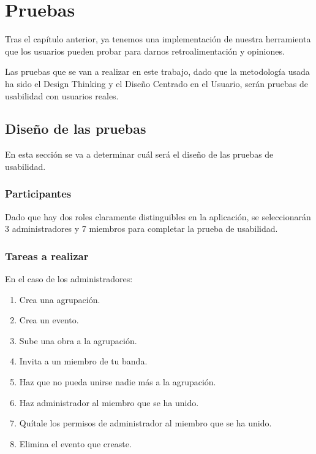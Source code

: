 \chapter{Pruebas}









Tras el capítulo anterior, ya tenemos una implementación de nuestra herramienta que los usuarios pueden probar para darnos retroalimentación y opiniones.

Las pruebas que se van a realizar en este trabajo, dado que la metodología usada ha sido el Design Thinking y el Diseño Centrado en el Usuario, serán pruebas de usabilidad con usuarios reales.

\section{Diseño de las pruebas}

En esta sección se va a determinar cuál será el diseño de las pruebas de usabilidad.

\subsection{Participantes}

Dado que hay dos roles claramente distinguibles en la aplicación, se seleccionarán 3 administradores y 7 miembros para completar la prueba de usabilidad.

\subsection{Tareas a realizar}

En el caso de los administradores:

\begin{enumerate}
    \item Crea una agrupación.
    \item Crea un evento.
    \item Sube una obra a la agrupación.
    \item Invita a un miembro de tu banda.
    \item Haz que no pueda unirse nadie más a la agrupación.
    \item Haz administrador al miembro que se ha unido.
    \item Quítale los permisos de administrador al miembro que se ha unido.
    \item Elimina el evento que creaste.
\end{enumerate}

